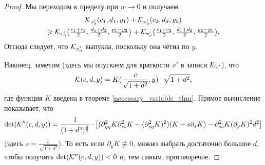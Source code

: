 \begin{proof}
Мы переходим к пределу при $w \to 0$ и получаем
\begin{multline*}
\K_{x_0'}(c_1, d_1, y_1) + \K_{x_0'}(c_2, d_2, y_2)
\\ \ge \K_{x_0'}\big({\textstyle \frac{c_1 + c_2}{2}, \frac{d_1 + d_2}{2},\frac{y_1 - y_2}{2}
}\big) + \K_{x_0'}\big({\textstyle \frac{c_1 + c_2}{2}, \frac{d_1 + d_2}{2}, \frac{y_2 -y_1}{2}}\big).
\end{multline*}
Отсюда следует, что $\mathcal{K}_{x_0'}$ выпукла, поскольку она чётна по $y$.

Наконец, заметим (здесь мы опускаем для краткости $x'$ в записи $\mathcal{K}_{x'}$), что
$$
\K(c,d,y)=K(\frac c{\sqrt{1 + d^2}}, y) \cdot \sqrt{1 + d^2},
$$
где функция $K$ введена в теореме \ref{necessary_variable_thm}.
Прямое вычисление показывает, что
$$
\det(\K''(c, d, y)) = \frac{1}{ (1 + d^2)^{ \frac{3}{2} } } \cdot \bigl[ (\partial^2_{yy} K \partial^2_{ss} K
- (\partial^2_{sy} K)^2) (K - s \partial_s K) - \partial^2_{ss} K (\partial_y K)^2 d^2 \bigr]
$$
(здесь $s = \frac{c}{\sqrt{1 + d^2}}$).
То есть если $\partial_y K \not\equiv 0$, можно выбрать достаточно большое $d$, чтобы получить $\det(\mathcal{K}''(c, d, y)) < 0$ и, тем самым, противоречие.
\end{proof}
